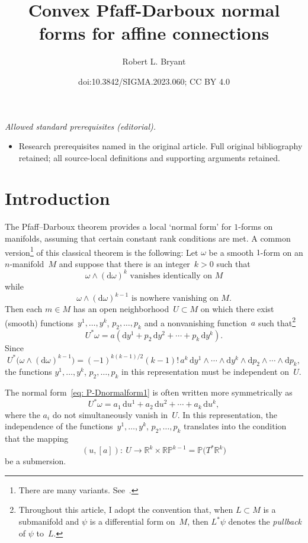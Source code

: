 \documentclass[10pt,a4paper]{amsart}
\title{Convex Pfaff-Darboux normal forms for affine connections}
\author{Robert L. Bryant}
\date{doi:10.3842/SIGMA.2023.060; CC BY 4.0}
\renewcommand{\d}{\mathrm{d}}%
\newcommand{\bbR}{{\mathbb R}}
\newcommand{\bbP}{{\mathbb P}}
\newcommand{\w}{\wedge}
\numberwithin{equation}{section}
\begin{document}
\maketitle
\noindent\textit{Allowed standard prerequisites (editorial).}\begin{itemize}
\item Research prerequisites named in the original article. Full original bibliography retained; all source-local definitions and supporting arguments retained.
\end{itemize}\medskip
\section{Introduction}%

The Pfaff--Darboux theorem provides a local `normal form'
for $1$-forms on manifolds, assuming that certain constant rank
conditions are met. A common version\footnote{There are many variants. See~\cite[Chapter II, Section~3]{MR1083148}.}
of this classical theorem
is the following: Let $\omega$ be a smooth $1$-form on an $n$-manifold~$M$
and suppose that there is an integer~$k>0$ such that
\[
\text{$\omega\w(\d\omega)^k$ vanishes identically on $M$}
\]
while
\[
\text{$\omega\w(\d\omega)^{k-1}$ is nowhere vanishing on $M$.}
\]
Then each $m\in M$ has an open neighborhood~$U\subset M$
on which there exist (smooth) functions~$y^1,\ldots,y^k$, $p_2,\ldots,p_k$
and a nonvanishing function~$a$ such that\footnote{Throughout this article, I adopt the convention that,
when $L\subset M$ is a submanifold and $\psi$ is a differential
form on~$M$, then $L^*\psi$ denotes the \emph{pullback} of $\psi$ to~$L$.}
\begin{equation}\label{eq: P-Dnormalform1}
U^*\omega = a (\d y^1 + p_2\,\d y^2 + \cdots + p_k\,\d y^k).
\end{equation}
Since
\[
U^*\bigl(\omega\w(\d\omega)^{k-1}\bigr)
=(-1)^{k(k-1)/2}(k{-}1)!\,a^k\,\d y^1\w\cdots\w\d y^k\w\d p_2\w\cdots\w\d p_k,
\]
the functions $y^1,\ldots,y^k$, $p_2,\ldots,p_k$
in this representation must be independent on~$U$.

The normal form~\eqref{eq: P-Dnormalform1}
is often written more symmetrically as
\begin{equation}\label{eq: P-Dnormalform2}
U^*\omega = a_1\,\d u^1 + a_2\,\d u^2 + \cdots + a_k\,\d u^k,
\end{equation}
where the $a_i$ do not simultaneously vanish in~$U$.
In this representation, the independence
of the functions~$y^1,\ldots,y^k$, $p_2,\ldots,p_k$
translates into the condition that the mapping
\begin{equation*}%
(u,[a])\colon \ U\to \bbR^k\times\bbR\bbP^{k-1}
= \bbP\bigl(T^*\bbR^k\bigr)
\end{equation*}
be a submersion.
\end{document}
